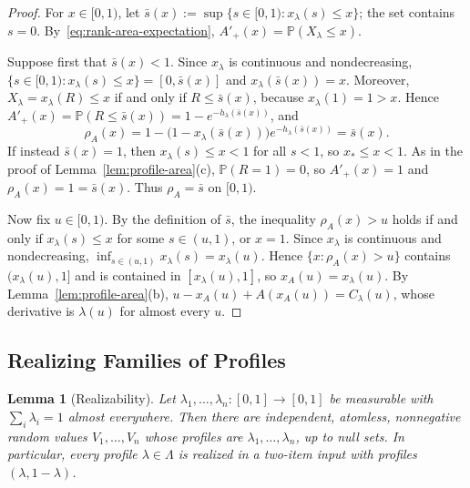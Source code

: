 \documentclass[11pt]{article}
\newtheorem{lemma}[theorem]{Lemma}
\theoremstyle{definition}
\theoremstyle{remark}
\newcommand{\Pp}{\mathbb P}
\begin{document}
\begin{proof}
For $x\in[0,1)$, let $\bar s(x):=\sup\{s\in[0,1):x_\lambda(s)\le x\}$; the set contains $s=0$.
By~\eqref{eq:rank-area-expectation}, $A'_+(x)=\Pp(X_\lambda\le x)$.

Suppose first that $\bar s(x)<1$.
Since $x_\lambda$ is continuous and nondecreasing, $\{s\in[0,1):x_\lambda(s)\le x\}=[0,\bar s(x)]$ and $x_\lambda(\bar s(x))=x$.
Moreover, $X_\lambda=x_\lambda(R)\le x$ if and only if $R\le\bar s(x)$, because $x_\lambda(1)=1>x$.
Hence $A'_+(x)=\Pp(R\le\bar s(x))=1-e^{-h_\lambda(\bar s(x))}$, and
\[
 \rho_A(x)=1-\bigl(1-x_\lambda(\bar s(x))\bigr)e^{-h_\lambda(\bar s(x))}=\bar s(x).
\]
If instead $\bar s(x)=1$, then $x_\lambda(s)\le x<1$ for all $s<1$, so $x_*\le x<1$.
As in the proof of Lemma~\ref{lem:profile-area}(c), $\Pp(R=1)=0$, so $A'_+(x)=1$ and $\rho_A(x)=1=\bar s(x)$.
Thus $\rho_A=\bar s$ on $[0,1)$.

Now fix $u\in[0,1)$.
By the definition of $\bar s$, the inequality $\rho_A(x)>u$ holds if and only if $x_\lambda(s)\le x$ for some $s\in(u,1)$, or $x=1$.
Since $x_\lambda$ is continuous and nondecreasing, $\inf_{s\in(u,1)}x_\lambda(s)=x_\lambda(u)$.
Hence $\{x:\rho_A(x)>u\}$ contains $(x_\lambda(u),1]$ and is contained in $[x_\lambda(u),1]$, so $x_A(u)=x_\lambda(u)$.
By Lemma~\ref{lem:profile-area}(b), $u-x_A(u)+A(x_A(u))=C_\lambda(u)$, whose derivative is $\lambda(u)$ for almost every $u$.
\end{proof}

\subsection{Realizing Families of Profiles}\label{app:realization}

\begin{lemma}[Realizability]\label{lem:profile-realization}
Let $\lambda_1,\ldots,\lambda_n:[0,1]\to[0,1]$ be measurable with $\sum_i\lambda_i=1$ almost everywhere.
Then there are independent, atomless, nonnegative random values $V_1,\ldots,V_n$ whose profiles are $\lambda_1,\ldots,\lambda_n$, up to null sets.
In particular, every profile $\lambda\in\Lambda$ is realized in a two-item input with profiles $(\lambda,1-\lambda)$.
\end{lemma}
\end{document}
